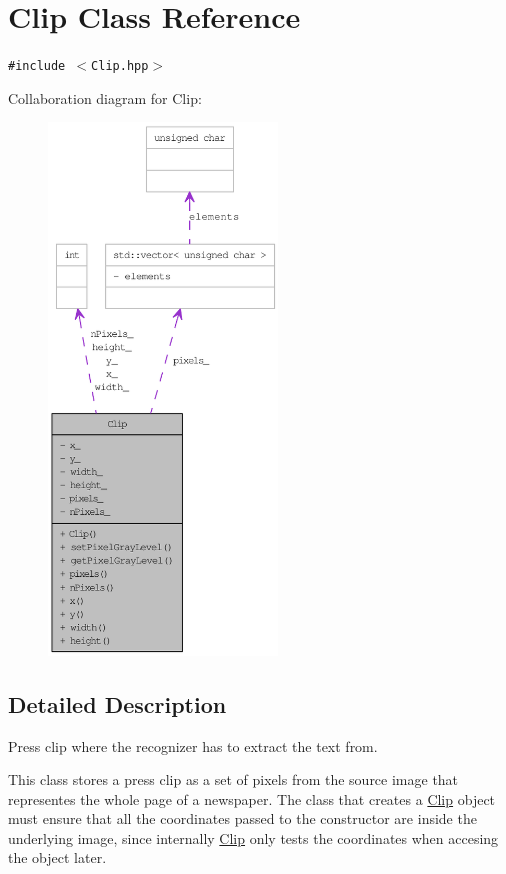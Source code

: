 \hypertarget{class_clip}{
\section{Clip Class Reference}
\label{class_clip}
}
{\tt \#include $<$Clip.hpp$>$}

Collaboration diagram for Clip:\nopagebreak
\begin{figure}[H]
\begin{center}
\leavevmode
\includegraphics[height=400pt]{class_clip__coll__graph}
\end{center}
\end{figure}


\subsection{Detailed Description}
Press clip where the recognizer has to extract the text from. 

This class stores a press clip as a set of pixels from the source image that representes the whole page of a newspaper. The class that creates a \hyperlink{class_clip}{Clip} object must ensure that all the coordinates passed to the constructor are inside the underlying image, since internally \hyperlink{class_clip}{Clip} only tests the coordinates when accesing the object later.

